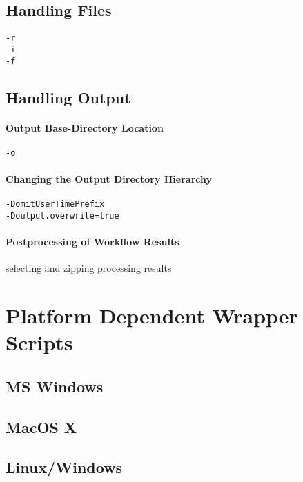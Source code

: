 \subsection{Handling Files}

\begin{verbatim}
-r
-i
-f
\end{verbatim}
\subsection{Handling Output}

\paragraph{Output Base-Directory Location}
\begin{verbatim}
-o
\end{verbatim}
\paragraph{Changing the Output Directory Hierarchy}
\begin{verbatim}
-DomitUserTimePrefix
-Doutput.overwrite=true
\end{verbatim}
\paragraph{Postprocessing of Workflow Results}
selecting and zipping processing results

\section{Platform Dependent Wrapper Scripts}

\subsection{MS Windows}
\subsection{MacOS X}
\subsection{Linux/Windows}